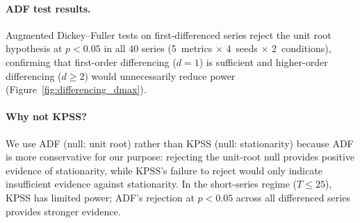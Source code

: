 \begin{table}[t]
\centering
\small
\caption{Empirical AR(1) coefficients (Pythia-410M, 4~seeds). ``Raw'' = levels; ``Diff'' = first-differenced.}
\label{tab:empirical_ar1}
\end{table}

\paragraph{ADF test results.}
Augmented Dickey--Fuller tests on first-differenced series reject the unit root hypothesis at $p{<}0.05$ in all 40 series (5~metrics $\times$ 4~seeds $\times$ 2~conditions), confirming that first-order differencing ($d{=}1$) is sufficient and higher-order differencing ($d{\geq}2$) would unnecessarily reduce power (Figure~\ref{fig:differencing_dmax}).

\paragraph{Why not KPSS?}
We use ADF (null: unit root) rather than KPSS (null: stationarity) because ADF is more conservative for our purpose: rejecting the unit-root null provides positive evidence of stationarity, while KPSS's failure to reject would only indicate insufficient evidence against stationarity.
In the short-series regime ($T{\leq}25$), KPSS has limited power; ADF's rejection at $p{<}0.05$ across all differenced series provides stronger evidence.

